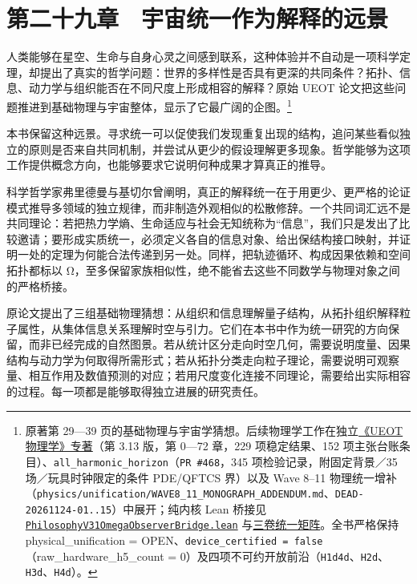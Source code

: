 \documentclass[
  11pt,
  oneside]{book}
\begin{document}
\par\endgroup

\chapter{第二十九章　宇宙统一作为解释的远景}\label{ph-ch-29}

人类能够在星空、生命与自身心灵之间感到联系，这种体验并不自动是一项科学定理，却提出了真实的哲学问题：世界的多样性是否具有更深的共同条件？拓扑、信息、动力学与组织能否在不同尺度上形成相容的解释？原始 UEOT 论文把这些问题推进到基础物理与宇宙整体，显示了它最广阔的企图。\footnote{\hypertarget{ph-note-65}{}原著第 29---39 页的基础物理与宇宙学猜想。后续物理学工作在独立\href{https://github.com/MurphyHoops/UEOT/blob/3d443ec29eb17af1fc00699a74e2d42d73516d81/physics/qm/book/UEOT_PHYSICS.md}{《UEOT 物理学》专著}（第 3.13 版，第 0---72 章，229 项稳定结果、152 项主张台账条目）、\texttt{all\_harmonic\_horizon}（\texttt{PR\ \#468}，345 项检验记录，附固定背景／35 场／玩具时钟限定的条件 PDE/QFTCS 界）以及 Wave 8--11 物理统一增补（\nolinkurl{physics/unification/WAVE8_11_MONOGRAPH_ADDENDUM.md}、\texttt{DEAD-20261124-01..15}）中展开；纯内核 Lean 桥接见 \href{https://github.com/MurphyHoops/UEOT/blob/3d443ec29eb17af1fc00699a74e2d42d73516d81/formalization/ueot-physics-unification/UEOTPhysicsUnification/PhilosophyV31OmegaObserverBridge.lean}{\nolinkurl{PhilosophyV31OmegaObserverBridge.lean}} 与\href{https://github.com/MurphyHoops/UEOT/blob/3d443ec29eb17af1fc00699a74e2d42d73516d81/physics/interfaces/PHILOSOPHY_MATHEMATICS_PHYSICS_UNIFICATION_MATRIX.md}{三卷统一矩阵}。全书严格保持 physical\_unification = OPEN、\texttt{device\_certified\ =\ false}（raw\_hardware\_h5\_count = 0）及四项不可约开放前沿（\texttt{H1d4d}、\texttt{H2d}、\texttt{H3d}、\texttt{H4d}）。}

本书保留这种远景。寻求统一可以促使我们发现重复出现的结构，追问某些看似独立的原则是否来自共同机制，并尝试从更少的假设理解更多现象。哲学能够为这项工作提供概念方向，也能够要求它说明何种成果才算真正的推导。

科学哲学家弗里德曼与基切尔曾阐明，真正的解释统一在于用更少、更严格的论证模式推导多领域的独立规律，而非制造外观相似的松散修辞。一个共同词汇远不是共同理论：若把热力学熵、生命适应与社会无知统称为``信息''，我们只是发出了比较邀请；要形成实质统一，必须定义各自的信息对象、给出保结构接口映射，并证明一处的定理为何能合法传递到另一处。同样，把轨迹循环、构成因果依赖和空间拓扑都标以 Ω，至多保留家族相似性，绝不能省去这些不同数学与物理对象之间的严格桥接。

原论文提出了三组基础物理猜想：从组织和信息理解量子结构，从拓扑组织解释粒子属性，从集体信息关系理解时空与引力。它们在本书中作为统一研究的方向保留，而非已经完成的自然图景。若从统计区分走向时空几何，需要说明度量、因果结构与动力学为何取得所需形式；若从拓扑分类走向粒子理论，需要说明可观察量、相互作用及数值预测的对应；若用尺度变化连接不同理论，需要给出实际相容的过程。每一项都是能够取得独立进展的研究责任。
\end{document}
